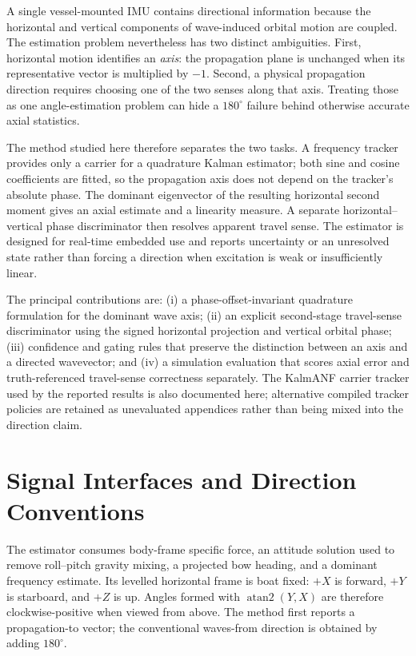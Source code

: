 \documentclass[conference]{IEEEtran}
\begin{document}
A single vessel-mounted IMU contains directional information because the
horizontal and vertical components of wave-induced orbital motion are coupled.
The estimation problem nevertheless has two distinct ambiguities.  First,
horizontal motion identifies an \emph{axis}: the propagation plane is unchanged
when its representative vector is multiplied by $-1$.  Second, a physical
propagation direction requires choosing one of the two senses along that axis.
Treating those as one angle-estimation problem can hide a $180^\circ$ failure
behind otherwise accurate axial statistics.

The method studied here therefore separates the two tasks.  A frequency tracker
provides only a carrier for a quadrature Kalman estimator; both sine and cosine
coefficients are fitted, so the propagation axis does not depend on the
tracker's absolute phase.  The dominant eigenvector of the resulting horizontal
second moment gives an axial estimate and a linearity measure.  A separate
horizontal--vertical phase discriminator then resolves apparent travel sense.
The estimator is designed for real-time embedded use and reports uncertainty or
an unresolved state rather than forcing a direction when excitation is weak or
insufficiently linear.

The principal contributions are: (i) a phase-offset-invariant quadrature
formulation for the dominant wave axis; (ii) an explicit second-stage
travel-sense discriminator using the signed horizontal projection and vertical
orbital phase; (iii) confidence and gating rules that preserve the distinction
between an axis and a directed wavevector; and (iv) a simulation evaluation
that scores axial error and truth-referenced travel-sense correctness
separately.  The KalmANF carrier tracker used by the reported results is also
documented here; alternative compiled tracker policies are retained as
unevaluated appendices rather than being mixed into the direction claim.

\section{Signal Interfaces and Direction Conventions}
\label{sec:direction-interfaces}

The estimator consumes body-frame specific force, an attitude solution used to
remove roll--pitch gravity mixing, a projected bow heading, and a dominant
frequency estimate.  Its levelled horizontal frame is boat fixed: $+X$ is
forward, $+Y$ is starboard, and $+Z$ is up.  Angles formed with
$\operatorname{atan2}(Y,X)$ are therefore clockwise-positive when viewed from
above.  The method first reports a propagation-to vector; the conventional
waves-from direction is obtained by adding $180^\circ$.
\end{document}
